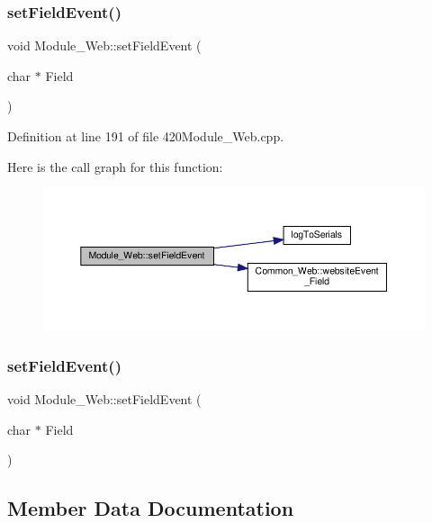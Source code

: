 \subsubsection{\texorpdfstring{set\+Field\+Event()}{setFieldEvent()}\hspace{0.1cm}{\footnotesize\ttfamily [1/2]}}
{\footnotesize\ttfamily void Module\+\_\+\+Web\+::set\+Field\+Event (\begin{DoxyParamCaption}\item[{char $\ast$}]{Field }\end{DoxyParamCaption})}



Definition at line 191 of file 420\+Module\+\_\+\+Web.\+cpp.

Here is the call graph for this function\+:
\nopagebreak
\begin{figure}[H]
\begin{center}
\leavevmode
\includegraphics[width=350pt]{class_module___web_abd603f024a00f8fd3bfd646ec38d6997_cgraph}
\end{center}
\end{figure}
\mbox{\label{class_module___web_abd603f024a00f8fd3bfd646ec38d6997}} 
\subsubsection{\texorpdfstring{set\+Field\+Event()}{setFieldEvent()}\hspace{0.1cm}{\footnotesize\ttfamily [2/2]}}
{\footnotesize\ttfamily void Module\+\_\+\+Web\+::set\+Field\+Event (\begin{DoxyParamCaption}\item[{char $\ast$}]{Field }\end{DoxyParamCaption})}



\subsection{Member Data Documentation}
\mbox{\label{class_module___web_af28272924b12501772a2dfc2d7c0c0d9}} 
